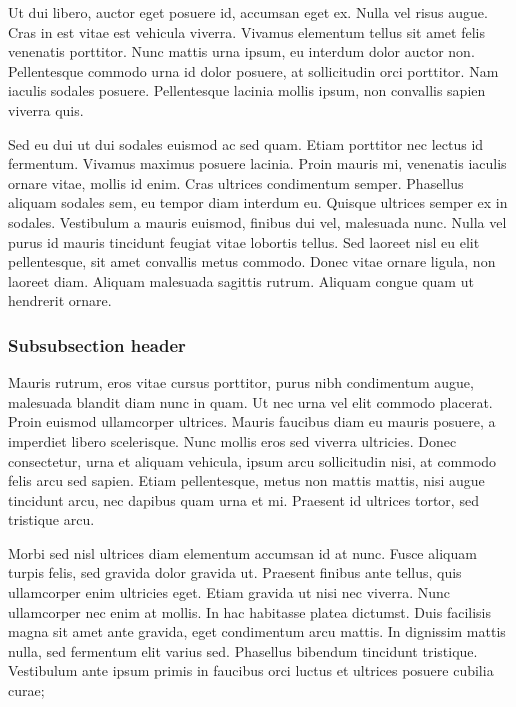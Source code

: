 \documentclass{article}
\begin{document}
Ut dui libero, auctor eget posuere id, accumsan eget ex. Nulla vel risus augue. Cras in est vitae est vehicula viverra. Vivamus elementum tellus sit amet felis venenatis porttitor. Nunc mattis urna ipsum, eu interdum dolor auctor non. Pellentesque commodo urna id dolor posuere, at sollicitudin orci porttitor. Nam iaculis sodales posuere. Pellentesque lacinia mollis ipsum, non convallis sapien viverra quis.

Sed eu dui ut dui sodales euismod ac sed quam. Etiam porttitor nec lectus id fermentum. Vivamus maximus posuere lacinia. Proin mauris mi, venenatis iaculis ornare vitae, mollis id enim. Cras ultrices condimentum semper. Phasellus aliquam sodales sem, eu tempor diam interdum eu. Quisque ultrices semper ex in sodales. Vestibulum a mauris euismod, finibus dui vel, malesuada nunc. Nulla vel purus id mauris tincidunt feugiat vitae lobortis tellus. Sed laoreet nisl eu elit pellentesque, sit amet convallis metus commodo. Donec vitae ornare ligula, non laoreet diam. Aliquam malesuada sagittis rutrum. Aliquam congue quam ut hendrerit ornare.

\subsubsection{Subsubsection header}

Mauris rutrum, eros vitae cursus porttitor, purus nibh condimentum augue, malesuada blandit diam nunc in quam. Ut nec urna vel elit commodo placerat. Proin euismod ullamcorper ultrices. Mauris faucibus diam eu mauris posuere, a imperdiet libero scelerisque. Nunc mollis eros sed viverra ultricies. Donec consectetur, urna et aliquam vehicula, ipsum arcu sollicitudin nisi, at commodo felis arcu sed sapien. Etiam pellentesque, metus non mattis mattis, nisi augue tincidunt arcu, nec dapibus quam urna et mi. Praesent id ultrices tortor, sed tristique arcu.

Morbi sed nisl ultrices diam elementum accumsan id at nunc. Fusce aliquam turpis felis, sed gravida dolor gravida ut. Praesent finibus ante tellus, quis ullamcorper enim ultricies eget. Etiam gravida ut nisi nec viverra. Nunc ullamcorper nec enim at mollis. In hac habitasse platea dictumst. Duis facilisis magna sit amet ante gravida, eget condimentum arcu mattis. In dignissim mattis nulla, sed fermentum elit varius sed. Phasellus bibendum tincidunt tristique. Vestibulum ante ipsum primis in faucibus orci luctus et ultrices posuere cubilia curae;
\end{document}
